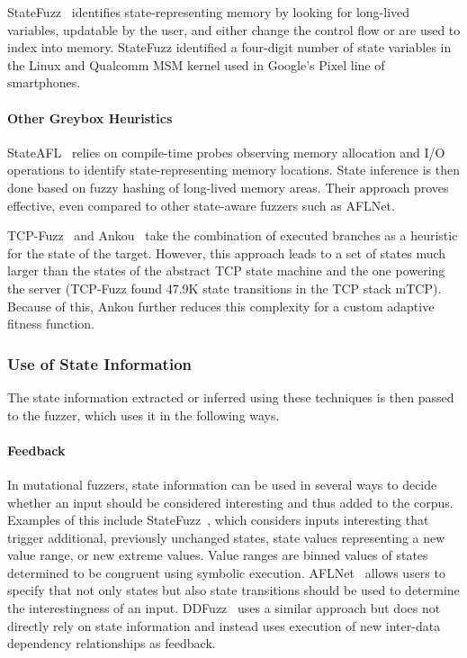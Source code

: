 \documentclass[twocolumn]{article}
\let\savedCite=\cite
\renewcommand{\cite}{\unskip~\savedCite}
\begin{document}
StateFuzz\cite{StateFuzz} identifies state-representing memory by looking for long-lived variables, updatable by the user, and either change the control flow or are used to index into memory. StateFuzz identified a four-digit number of state variables in the Linux and Qualcomm MSM kernel used in Google's Pixel line of smartphones.

\paragraph{Other Greybox Heuristics}

StateAFL\cite{StateAFL} relies on compile-time probes observing memory allocation and I/O operations to identify state-representing memory locations. State inference is then done based on fuzzy hashing of long-lived memory areas. Their approach proves effective, even compared to other state-aware fuzzers such as AFLNet.

TCP-Fuzz\cite{TCPFuzz} and Ankou\cite{Ankou} take the combination of executed branches as a heuristic for the state of the target. However, this approach leads to a set of states much larger than the states of the abstract TCP state machine and the one powering the server (TCP-Fuzz found 47.9K state transitions in the TCP stack mTCP). Because of this, Ankou further reduces this complexity for a custom adaptive fitness function.

\subsubsection{Use of State Information}
\label{RelatedWorks:ProtocolFuzzing:UseOfState}

The state information extracted or inferred using these techniques is then passed to the fuzzer, which uses it in the following ways.

\paragraph{Feedback}

In mutational fuzzers, state information can be used in several ways to decide whether an input should be considered interesting and thus added to the corpus. Examples of this include StateFuzz\cite{StateFuzz}, which considers inputs interesting that trigger additional, previously unchanged states, state values representing a new value range, or new extreme values. Value ranges are binned values of states determined to be congruent using symbolic execution. AFLNet\cite{AFLNET} allows users to specify that not only states but also state transitions should be used to determine the interestingness of an input. DDFuzz\cite{DDFuzz} uses a similar approach but does not directly rely on state information and instead uses execution of new inter-data dependency relationships as feedback.
\end{document}

